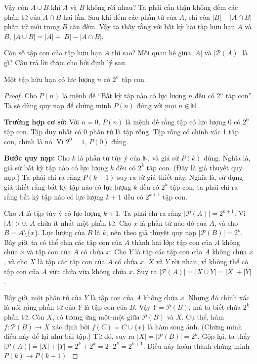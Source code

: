Vậy còn $A \cup B$ khi $A$ và $B$ không rời nhau? Ta phải cẩn thận không đếm các phần tử của $A \cap B$ hai lần. Sau khi đếm các phần tử của $A$, chỉ còn $|B| - |A \cap B|$ phần tử mới trong $B$ cần đếm. Vậy ta thấy rằng với bất kỳ hai tập hữu hạn $A$ và $B$, $|A \cup B| = |A| + |B| - |A \cap B|$.

Còn số tập con của tập hữu hạn $A$ thì sao? Mối quan hệ giữa $|A|$ và $|\mathcal{P}(A)|$ là gì? Câu trả lời được cho bởi định lý sau.

\begin{theorem}
Một tập hữu hạn có lực lượng $n$ có $2^n$ tập con.
\end{theorem}

\begin{proof}
Cho $P(n)$ là mệnh đề ``Bất kỳ tập nào có lực lượng $n$ đều có $2^n$ tập con''. Ta sẽ dùng quy nạp để chứng minh $P(n)$ đúng với mọi $n \in \mathbb{N}$.

\textbf{Trường hợp cơ sở:} Với $n = 0$, $P(n)$ là mệnh đề rằng tập có lực lượng $0$ có $2^0$ tập con. Tập duy nhất có 0 phần tử là tập rỗng. Tập rỗng có chính xác 1 tập con, chính là nó. Vì $2^0 = 1$, $P(0)$ đúng.

\textbf{Bước quy nạp:} Cho $k$ là phần tử tùy ý của $\mathbb{N}$, và giả sử $P(k)$ đúng. Nghĩa là, giả sử bất kỳ tập nào có lực lượng $k$ đều có $2^k$ tập con. (Đây là giả thuyết quy nạp.) Ta phải chỉ ra rằng $P(k+1)$ suy ra từ giả thiết này. Nghĩa là, sử dụng giả thiết rằng bất kỳ tập nào có lực lượng $k$ đều có $2^k$ tập con, ta phải chỉ ra rằng bất kỳ tập nào có lực lượng $k+1$ đều có $2^{k+1}$ tập con.

Cho $A$ là tập tùy ý có lực lượng $k+1$. Ta phải chỉ ra rằng $|\mathcal{P}(A)| = 2^{k+1}$. Vì $|A| > 0$, $A$ chứa ít nhất một phần tử. Cho $x$ là phần tử nào đó của $A$, và cho $B = A \setminus \{x\}$. Lực lượng của $B$ là $k$, nên theo giả thuyết quy nạp $|\mathcal{P}(B)| = 2^k$. Bây giờ, ta có thể chia các tập con của $A$ thành hai lớp: tập con của $A$ không chứa $x$ và tập con của $A$ có chứa $x$. Cho $Y$ là tập các tập con của $A$ không chứa $x$, và cho $X$ là tập các tập con của $A$ có chứa $x$. $X$ và $Y$ rời nhau, vì không thể có tập con của $A$ vừa chứa vừa không chứa $x$. Suy ra $|\mathcal{P}(A)| = |X \cup Y| = |X| + |Y|$.

Bây giờ, một phần tử của $Y$ là tập con của $A$ không chứa $x$. Nhưng đó chính xác là nói rằng phần tử của $Y$ là tập con của $B$. Vậy $Y = \mathcal{P}(B)$, mà ta biết chứa $2^k$ phần tử. Còn $X$, có tương ứng một-một giữa $\mathcal{P}(B)$ và $X$. Cụ thể, hàm $f\colon \mathcal{P}(B) \to X$ xác định bởi $f(C) = C \cup \{x\}$ là hàm song ánh. (Chứng minh điều này để lại như bài tập.) Từ đó, suy ra $|X| = |\mathcal{P}(B)| = 2^k$. Gộp lại, ta thấy $|\mathcal{P}(A)| = |X| + |Y| = 2^k + 2^k = 2 \cdot 2^k = 2^{k+1}$. Điều này hoàn thành chứng minh $P(k) \to P(k+1)$.
\end{proof}

